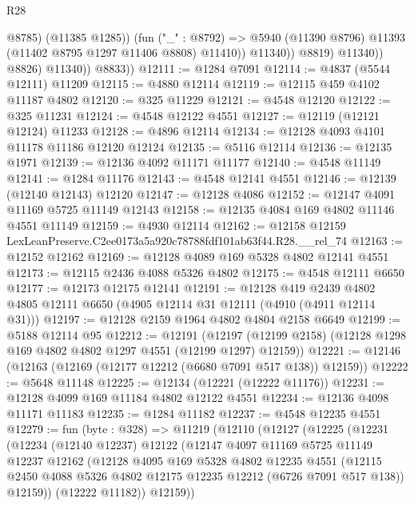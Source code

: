 \begin{lexlean}{R28}
\begin{coremodule}
                              @8785)
                            (@11385 @1285))
                          (fun ("_" : @8792) =>
                          @5940 (@11390 @8796) @11393 (@11402 @8795 @1297 @11406 @8808) @11410))
                        @11340))
                    @8819)
                  @11340))
              @8826)
            @11340))
        @8833))
@12111 := @1284 @7091
@12114 := @4837 (@5544 @12111) @11209
@12115 := @4880 @12114
@12119 := @12115 @459 @4102 @11187 @4802
@12120 := @325 @11229
@12121 := @4548 @12120
@12122 := @325 @11231
@12124 := @4548 @12122 @4551
@12127 := @12119 (@12121 @12124) @11233
@12128 := @4896 @12114
@12134 := @12128 @4093 @4101 @11178 @11186 @12120 @12124
@12135 := @5116 @12114
@12136 := @12135 @1971
@12139 := @12136 @4092 @11171 @11177
@12140 := @4548 @11149
@12141 := @1284 @11176
@12143 := @4548 @12141 @4551
@12146 := @12139 (@12140 @12143) @12120
@12147 := @12128 @4086
@12152 := @12147 @4091 @11169 @5725 @11149 @12143
@12158 := @12135 @4084 @169 @4802 @11146 @4551 @11149
@12159 := @4930 @12114
@12162 := @12158 @12159 LexLeanPreserve.C2ee0173a5a920c78788fdf101ab63f44.R28.__rel_74
@12163 := @12152 @12162
@12169 := @12128 @4089 @169 @5328 @4802 @12141 @4551
@12173 := @12115 @2436 @4088 @5326 @4802
@12175 := @4548 @12111 @6650
@12177 := @12173 @12175 @12141
@12191 := @12128
    @419
    @2439
    @4802
    @4805
    @12111
    @6650
    (@4905 @12114 @31 @12111 (@4910 (@4911 @12114 @31)))
@12197 := @12128 @2159 @1964 @4802 @4804 @2158 @6649
@12199 := @5188 @12114 @95
@12212 := @12191
    (@12197 (@12199 @2158) (@12128 @1298 @169 @4802 @4802 @1297 @4551 (@12199 @1297) @12159))
@12221 := @12146 (@12163 (@12169 (@12177 @12212 (@6680 @7091 @517 @138)) @12159))
@12222 := @5648 @11148
@12225 := @12134 (@12221 (@12222 @11176))
@12231 := @12128 @4099 @169 @11184 @4802 @12122 @4551
@12234 := @12136 @4098 @11171 @11183
@12235 := @1284 @11182
@12237 := @4548 @12235 @4551
@12279 := fun (byte : @328) =>
  @11219
    (@12110
      (@12127
        (@12225
          (@12231
            (@12234
              (@12140 @12237)
              @12122
              (@12147
                @4097
                @11169
                @5725
                @11149
                @12237
                @12162
                (@12128
                  @4095
                  @169
                  @5328
                  @4802
                  @12235
                  @4551
                  (@12115 @2450 @4088 @5326 @4802 @12175 @12235 @12212 (@6726 @7091 @517 @138))
                  @12159))
              (@12222 @11182))
            @12159))

\end{coremodule}
\end{lexlean}
